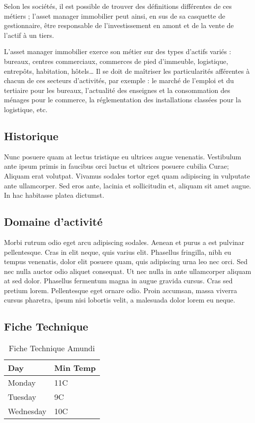 \par Selon les sociétés, il est possible de trouver des définitions différentes de ces métiers ; l’asset manager immobilier peut ainsi, en sus de sa casquette de gestionnaire, être responsable de l'investissement en amont et de la vente de l'actif à un tiers.
\par L’asset manager immobilier exerce son métier sur des types d'actifs variés : bureaux, centres commerciaux, commerces de pied d'immeuble, logistique, entrepôts, habitation, hôtels… Il se doit de maîtriser les particularités afférentes à chacun de ces secteurs d'activités, par exemple : le marché de l'emploi et du tertiaire pour les bureaux, l'actualité des enseignes et la consommation des ménages pour le commerce, la réglementation des installations classées pour la logistique, etc.

\subsection{Historique}

Nunc posuere quam at lectus tristique eu ultrices augue venenatis. Vestibulum ante ipsum primis in faucibus orci luctus et ultrices posuere cubilia Curae; Aliquam erat volutpat. Vivamus sodales tortor eget quam adipiscing in vulputate ante ullamcorper. Sed eros ante, lacinia et sollicitudin et, aliquam sit amet augue. In hac habitasse platea dictumst.


\subsection{Domaine d'activité}
Morbi rutrum odio eget arcu adipiscing sodales. Aenean et purus a est pulvinar pellentesque. Cras in elit neque, quis varius elit. Phasellus fringilla, nibh eu tempus venenatis, dolor elit posuere quam, quis adipiscing urna leo nec orci. Sed nec nulla auctor odio aliquet consequat. Ut nec nulla in ante ullamcorper aliquam at sed dolor. Phasellus fermentum magna in augue gravida cursus. Cras sed pretium lorem. Pellentesque eget ornare odio. Proin accumsan, massa viverra cursus pharetra, ipsum nisi lobortis velit, a malesuada dolor lorem eu neque.



\subsection{Fiche Technique}
\begin{table}[htp]
    \begin{center}
        \begin{tabular}{ | l | l |}
            \hline
            Day & Min Temp  \\ \hline
            Monday & 11C \\ \hline
            Tuesday & 9C  \\ \hline
            Wednesday & 10C  \\
            \hline
            \end{tabular}
            \caption{Fiche Technique Amundi}
    \end{center}
\end{table}